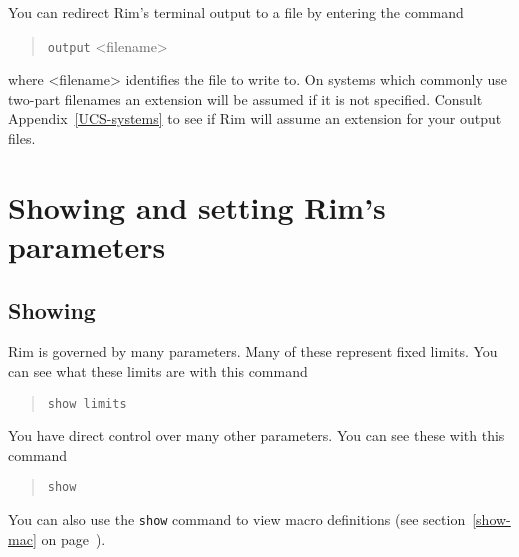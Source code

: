 \documentclass[11pt,a4paper]{report}
\begin{document}
You can redirect Rim's terminal output to a file by
entering the command
\begin{verse}
 \verb!output! <filename>
\end{verse}
where <filename> identifies the file to write to.
On systems which commonly use two-part filenames an extension
will be assumed if it is not specified.
Consult Appendix~\ref{UCS-systems} to
see if Rim will assume an extension for your output files.


\section{Showing and setting Rim's parameters}
%
\subsection{Showing}
Rim is governed by many parameters.  Many of these represent
fixed limits.  You can see what these limits are with
this command
\begin{verse}
\verb!show limits!
\end{verse}
You have direct control over many other parameters.
You can see these with
this command
\begin{verse}
  \verb!show!
  \end{verse}
\label{show}
 
You can also use the \verb!show! command to view macro definitions
(see section~\ref{show-mac} on page~\pageref{show-mac}).
 
\end{document}
